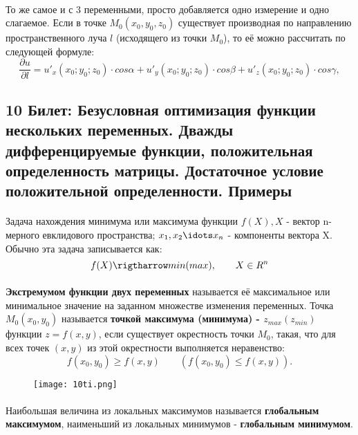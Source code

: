 \documentclass[14pt, letterpaper]{article}
\begin{document}
\paragraph{}
То же самое и с 3 переменными, просто добавляется одно измерение и одно слагаемое.
Если в точке $M_{0}(x_{0}, y_{0}, z_{0})$ существует производная по направлению пространственного луча $l$ (исходящего из точки $M_{0}$), то её можно рассчитать по следующей формуле:
    $$\frac{\partial u}{\partial l} = u\prime_{x}(x_{0}; y_{0}; z_{0}) \cdot cos\alpha + u\prime_{y}(x_{0}; y_{0}; z_{0}) \cdot cos\beta + u\prime_{z}(x_{0}; y_{0}; z_{0}) \cdot cos\gamma, $$

\newpage
\subsection{10 Билет: Безусловная оптимизация функции нескольких переменных. Дважды дифференцируемые функции, 
положительная определенность матрицы. Достаточное условие положительной определенности. Примеры}

\paragraph{}
Задача нахождения минимума или максимума функции $f(X), X$ - вектор n-мерного евклидового пространства; $x_{1}, x_{2} \idots x_{n}$ - компоненты вектора X. Обычно эта задача записывается как: 
    $$f(X) \rigtharrow min(max), \qquad X \in R^{n}$$
\paragraph{}
\textbf{Экстремумом функции двух переменных} называется её максимальное или минимальное значение на заданном множестве изменения переменных. Точка $M_{0} (x_{0}, y_{0})$ называется \textbf{точкой максимума (минимума) - $z_{max} (z_{min})$} функции $z = f(x, y)$, если существует окрестность точки $M_{0}$, такая, что для всех точек $(x, y)$ из этой окрестности выполняется неравенство:
    $$f(x_{0}, y_{0}) \geq f(x, y) \qquad (f(x_{0}, y_{0}) \leq f(x, y)).$$

    \begin{figure}[h]
    \centering       
    \texttt{[image: 10ti.png]}        
    \end{figure}

\paragraph{}
Наибольшая величина из локальных максимумов называется \textbf{глобальным максимумом}, наименьший из локальных минимумов - \textbf{глобальным минимумом}.
\end{document}

